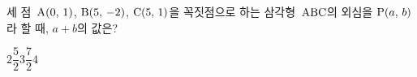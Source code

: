 세 점~$\mathrm{A}(0,\,1)$, $\mathrm{B}(5,\,-2)$, $\mathrm{C}(5,\,1)$을 꼭짓점으로 하는 삼각형~$\mathrm{ABC}$의 외심을 $\mathrm{P}(a,\,b)$라 할 때, $a+b$의 값은?
\begin{choices32}{$2$}{$\dfrac{5}{2}$}{$3$}{$\dfrac{7}{2}$}{$4$}\end{choices32}

